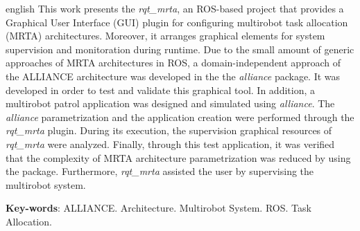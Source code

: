 \begin{resumo}[Abstract]
    \begin{otherlanguage*}{english}
        This work presents the \textit{rqt\_mrta}, an ROS-based project that provides a Graphical User Interface (GUI) plugin for configuring multirobot task allocation (MRTA) architectures. Moreover, it arranges graphical elements for system supervision and monitoration during runtime. Due to the small amount of generic approaches of MRTA architectures in ROS, a domain-independent approach of the ALLIANCE architecture was developed in the the \textit{alliance} package. It was developed in order to test and validate this graphical tool. In addition, a multirobot patrol application was designed and simulated using \textit{alliance}. The \textit{alliance} parametrization and the application creation were performed through the \textit{rqt\_mrta} plugin. During its execution, the supervision graphical resources of \textit{rqt\_mrta} were analyzed. Finally, through this test application, it was verified that the complexity of MRTA architecture parametrization was reduced by using the package. Furthermore, \textit{rqt\_mrta} assisted the user by supervising the multirobot system.
        
        \vspace{\onelineskip}
        
        \noindent 
        \textbf{Key-words}: ALLIANCE. Architecture. Multirobot System. ROS. Task Allocation. 
    \end{otherlanguage*}
\end{resumo}
\newpage